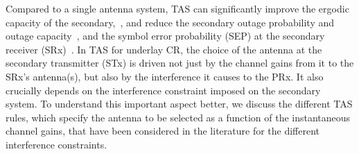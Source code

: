 \documentclass[12pt,draftcls,peerreview,onecolumn]{IEEEtran}
\begin{document}
Compared to a single antenna system, TAS can significantly improve the ergodic capacity of the secondary,~\cite{Hanif_2015_globecom,Wang_2010_TWC}, and reduce the secondary outage probability and outage capacity~\cite{Kong_2011_JCN}, and the symbol error probability (SEP) at the secondary receiver (SRx)~\cite{Sarvendranath_2013_TCOM,Sarvendranath_2014_TCOM}. In TAS for underlay CR, the choice of the antenna at the secondary transmitter (STx) is driven not just by the channel gains from it to the SRx's antenna(s), but also by the interference it causes to the PRx. It also crucially depends on the interference constraint imposed on the secondary system. To understand this important aspect better, we discuss the different TAS rules, which specify the antenna to be selected as a function of the instantaneous channel gains, that have been considered in the literature for the different interference constraints. 
%
\end{document}

